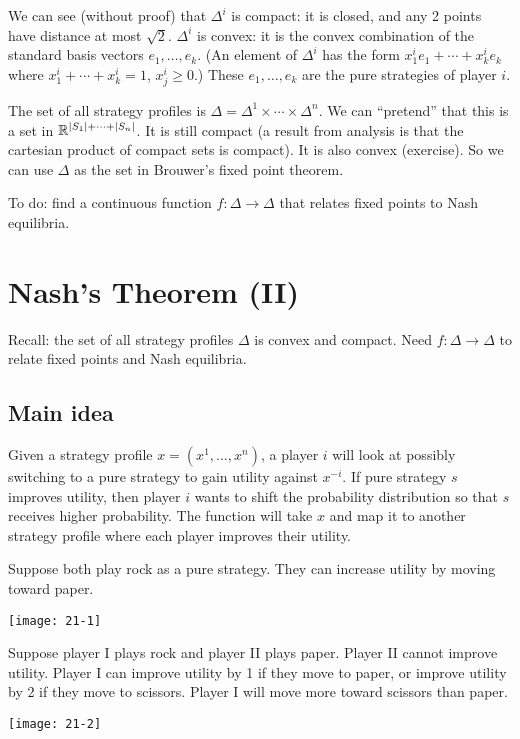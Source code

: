 \documentclass[12pt,letterpaper]{report}
\begin{document}
We can see (without proof) that $\Delta^i$ is compact: it is closed, and any 2 points have distance
at most $\sqrt{2}$.
$\Delta^i$ is convex: it is the convex combination of the standard basis vectors $e_1, \ldots, e_k$.
(An element of $\Delta^i$ has the form $x_1^i e_1 + \cdots + x_k^i e_k$ where
$x_1^i + \cdots + x_k^i = 1$, $x_j^i \geq 0$.)
These $e_1, \ldots, e_k$ are the pure strategies of player $i$.

The set of all strategy profiles is $\Delta = \Delta^1 \times \cdots \times \Delta^n$.
We can ``pretend'' that this is a set in $\mathbb{R}^{\lvert S_1\rvert + \cdots + \lvert S_n\rvert}$.
It is still compact (a result from analysis is that the cartesian product of compact sets is
compact).
It is also convex (exercise).
So we can use $\Delta$ as the set in Brouwer's fixed point theorem.

To do: find a continuous function $f \colon \Delta \to \Delta$ that relates fixed points to Nash
equilibria.

\section{Nash's Theorem (II)}

Recall: the set of all strategy profiles $\Delta$ is convex and compact.
Need $f \colon \Delta \to \Delta$ to relate fixed points and Nash equilibria.

\subsection{Main idea}

Given a strategy profile $x = (x^1, \ldots, x^n)$, a player $i$ will look at possibly switching to a
pure strategy to gain utility against $x^{-i}$.
If pure strategy $s$ improves utility, then player $i$ wants to shift the probability distribution
so that $s$ receives higher probability.
The function will take $x$ and map it to another strategy profile where each player improves their
utility.

\begin{ex}
  Suppose both play rock as a pure strategy.
  They can increase utility by moving toward paper.
  \begin{center}
    \texttt{[image: 21-1]}
  \end{center}
  Suppose player I plays rock and player II plays paper.
  Player II cannot improve utility.
  Player I can improve utility by 1 if they move to paper, or improve utility by 2 if they move to
  scissors.
  Player I will move more toward scissors than paper.
  \begin{center}
    \texttt{[image: 21-2]}
  \end{center}
\end{ex}
\end{document}
